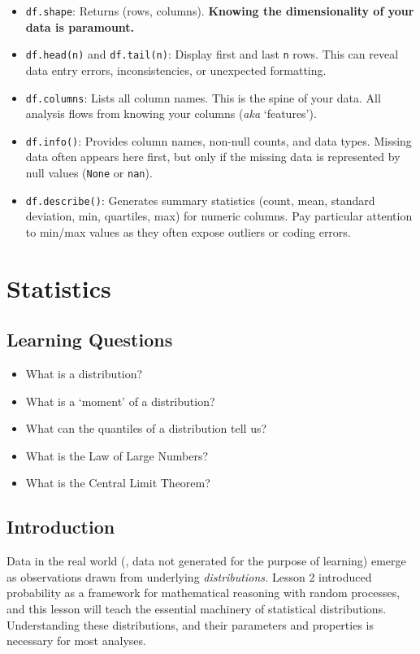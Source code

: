 \begin{itemize}
    \item \verb|df.shape|: Returns (rows, columns). \textbf{Knowing the dimensionality of your data is paramount.}
    \item \verb|df.head(n)| and \verb|df.tail(n)|: Display first and last \verb|n| rows. This can reveal data entry errors, inconsistencies, or unexpected formatting.
    \item \verb|df.columns|: Lists all column names. This is the spine of your data. All analysis flows from knowing your columns (\textit{aka} `features').
    \item \verb|df.info()|: Provides column names, non-null counts, and data types. Missing data often appears here first, but only if the missing data is represented by null values (\verb|None| or \verb|nan|).
    \item \verb|df.describe()|: Generates summary statistics (count, mean, standard deviation, min, quartiles, max) for numeric columns. Pay particular attention to min/max values as they often expose outliers or coding errors.
\end{itemize}

\clearpage
\section{Statistics}
\subsection*{Learning Questions}
\begin{itemize}
    \item What is a distribution?
    \item What is a `moment' of a distribution?
    \item What can the quantiles of a distribution tell us?
    \item What is the Law of Large Numbers?
    \item What is the Central Limit Theorem?
\end{itemize}

\subsection*{Introduction}
Data in the real world (\ie{}, data not generated for the purpose of learning) emerge as observations drawn from underlying \textit{distributions.} Lesson 2 introduced probability as a framework for mathematical reasoning with random processes, and this lesson will teach the essential machinery of statistical distributions. Understanding these distributions, and their parameters and properties is necessary for most analyses.

